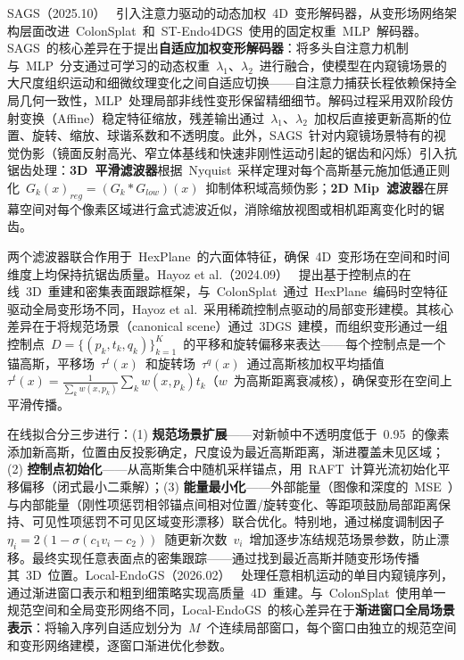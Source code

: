 SAGS（2025.10）~\cite{2510_27318} 引入注意力驱动的动态加权~4D~变形解码器，从变形场网络架构层面改进~ColonSplat~和~ST-Endo4DGS~使用的固定权重~MLP~解码器。SAGS~的核心差异在于提出\textbf{自适应加权变形解码器}：将多头自注意力机制与~MLP~分支通过可学习的动态权重~$\lambda_1$、$\lambda_2$~进行融合，使模型在内窥镜场景的大尺度组织运动和细微纹理变化之间自适应切换——自注意力捕获长程依赖保持全局几何一致性，MLP~处理局部非线性变形保留精细细节。解码过程采用双阶段仿射变换（Affine）稳定特征缩放，残差输出通过~$\lambda_1$、$\lambda_2$~加权后直接更新高斯的位置、旋转、缩放、球谐系数和不透明度。此外，SAGS~针对内窥镜场景特有的视觉伪影（镜面反射高光、窄立体基线和快速非刚性运动引起的锯齿和闪烁）引入抗锯齿处理：\textbf{3D~平滑滤波器}根据~Nyquist~采样定理对每个高斯基元施加低通正则化~$G_k(x)_{reg} = (G_k * G_{low})(x)$~抑制体积域高频伪影；\textbf{2D Mip~滤波器}在屏幕空间对每个像素区域进行盒式滤波近似，消除缩放视图或相机距离变化时的锯齿。

两个滤波器联合作用于~HexPlane~的六面体特征，确保~4D~变形场在空间和时间维度上均保持抗锯齿质量。Hayoz et al.（2024.09）~\cite{2409_06037} 提出基于控制点的在线~3D~重建和密集表面跟踪框架，与~ColonSplat~通过~HexPlane~编码时空特征驱动全局变形场不同，Hayoz et al.~采用稀疏控制点驱动的局部变形建模。其核心差异在于将规范场景（canonical scene）通过~3DGS~建模，而组织变形通过一组控制点~$D = \{(p_k, t_k, q_k)\}_{k=1}^K$~的平移和旋转偏移来表达——每个控制点是一个锚高斯，平移场~$\tau^t(x)$~和旋转场~$\tau^q(x)$~通过高斯核加权平均插值~$\tau^t(x) = \frac{1}{\sum_k w(x, p_k)} \sum_k w(x, p_k) t_k$（$w$~为高斯距离衰减核），确保变形在空间上平滑传播。

在线拟合分三步进行：(1) \textbf{规范场景扩展}——对新帧中不透明度低于~0.95~的像素添加新高斯，位置由反投影确定，尺度设为最近高斯距离，渐进覆盖未见区域；(2) \textbf{控制点初始化}——从高斯集合中随机采样锚点，用~RAFT~计算光流初始化平移偏移（闭式最小二乘解）；(3) \textbf{能量最小化}——外部能量（图像和深度的~MSE~）与内部能量（刚性项惩罚相邻锚点间相对位置/旋转变化、等距项鼓励局部距离保持、可见性项惩罚不可见区域变形漂移）联合优化。特别地，通过梯度调制因子~$\eta_i = 2(1 - \sigma(c_1 v_i - c_2))$~随更新次数~$v_i$~增加逐步冻结规范场景参数，防止漂移。最终实现任意表面点的密集跟踪——通过找到最近高斯并随变形场传播其~3D~位置。Local-EndoGS（2026.02）~\cite{2602_17473} 处理任意相机运动的单目内窥镜序列，通过渐进窗口表示和粗到细策略实现高质量~4D~重建。与~ColonSplat~使用单一规范空间和全局变形网络不同，Local-EndoGS~的核心差异在于\textbf{渐进窗口全局场景表示}：将输入序列自适应划分为~$M$~个连续局部窗口，每个窗口由独立的规范空间和变形网络建模，逐窗口渐进优化参数。

